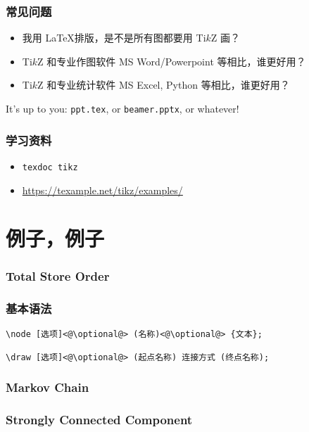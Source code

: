 \documentclass[usenames,xcolor=svgnames,11pt,sans,handout]{beamer}
\let\t\texttt
\begin{document}
\begin{frame}
    \frametitle{常见问题}

    \begin{itemize}
        \item 我用 \LaTeX 排版，是不是所有图都要用 Ti$k$Z 画？
        \pause
        \item Ti$k$Z 和专业作图软件 MS Word/Powerpoint 等相比，谁更好用？
        \pause
        \item Ti$k$Z 和专业统计软件 MS Excel, Python 等相比，谁更好用？
    \end{itemize}

    \pause
    \vspace{20pt}
    It's up to you: \t{ppt.tex}, or \t{beamer.pptx}, or whatever!
\end{frame}

\begin{frame}
    \frametitle{学习资料}

    \begin{itemize}
        \item \t{texdoc tikz}
        \item \url{https://texample.net/tikz/examples/}
    \end{itemize}
\end{frame}

\section{例子，例子}

\begin{frame}
    \frametitle{Total Store Order}

    \centering
\end{frame}

\begin{frame}[fragile]
    \frametitle{基本语法}

    \begin{lstlisting}
\node [选项]<@\optional@> (名称)<@\optional@> {文本};

\draw [选项]<@\optional@> (起点名称) 连接方式 (终点名称);
    \end{lstlisting}
\end{frame}

\begin{frame}
    \frametitle{Markov Chain}

    \centering
\end{frame}

\begin{frame}
    \frametitle{Strongly Connected Component}

    \centering
\end{frame}
\end{document}
